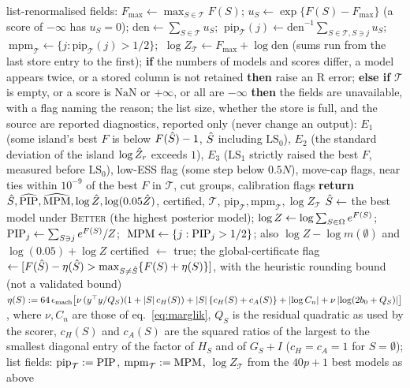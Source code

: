 \begin{algorithm}
{\begin{algorithmic}[1]
\State list-renormalised fields: $F_{\max}\gets\max_{S\in\mathcal T}F(S)$; $u_S\gets\exp\{F(S)-F_{\max}\}$ (a score of $-\infty$ has $u_S=0$); $\mathrm{den}\gets\sum_{S\in\mathcal T}u_S$; $\ \mathrm{pip}_{\mathcal T}(j)\gets\mathrm{den}^{-1}\sum_{S\in\mathcal T,S\ni j}u_S$; $\ \mathrm{mpm}_{\mathcal T}\gets\{j:\mathrm{pip}_{\mathcal T}(j)>1/2\}$; $\ \log Z_{\mathcal T}\gets F_{\max}+\log\mathrm{den}$ (sums run from the last store entry to the first); \textbf{if} the numbers of models and scores differ, a model appears twice, or a stored column is not retained \textbf{then} raise an R error; \textbf{else if} $\mathcal T$ is empty, or a score is $\mathrm{NaN}$ or $+\infty$, or all are $-\infty$ \textbf{then} the fields are unavailable, with a flag naming the reason; the list size, whether the store is full, and the source are reported %
\State diagnostics, reported only (never change an output): $E_1$ (some island's best $F$ is below $F(\hat S)-1$, $\hat S$ including $\mathrm{LS}_0$), $E_2$ (the standard deviation of the island $\log\hat Z_r$ exceeds $1$), $E_3$ ($\mathrm{LS}_1$ strictly raised the best $F$, measured before $\mathrm{LS}_0$), low-ESS flag (some step below $0.5N$), move-cap flags, near ties within $10^{-9}$ of the best $F$ in $\mathcal T$, cut groups, calibration flags %
\State \textbf{return} $\hat S,\widehat{\mathrm{PIP}},\widehat{\mathrm{MPM}},\log\hat Z,\log(0.05\hat Z)$, certified, $\mathcal T$, $\mathrm{pip}_{\mathcal T},\mathrm{mpm}_{\mathcal T},\log Z_{\mathcal T}$ %
\EndProcedure
{}
\State $\hat S\gets$ the best model under \textsc{Better} (the highest posterior model); $\log Z\gets\log\sum_{S\in\Omega}e^{F(S)}$; $\mathrm{PIP}_j\gets\sum_{S\ni j}e^{F(S)}/Z$; $\ \mathrm{MPM}\gets\{j:\mathrm{PIP}_j>1/2\}$; also $\log Z-\log m(\emptyset)$ and $\log(0.05)+\log Z$ %
\State certified $\gets$ true; the global-certificate flag $\gets[F(\hat S)-\eta(\hat S)>\max_{S\ne\hat S}\{F(S)+\eta(S)\}]$, with the heuristic rounding bound (not a validated bound) $\eta(S):=64\,\epsilon_{\mathrm{mach}}\big[\nu\,(y^\top y/Q_S)(1+\lvert S\rvert\,c_H(S))+\lvert S\rvert\,\{c_H(S)+c_A(S)\}+\lvert \log C_n\rvert+\nu\,\lvert \log(2b_0+Q_S)\rvert\big]$, where $\nu,C_n$ are those of eq.~\eqref{eq:marglik}, $Q_S$ is the residual quadratic as used by the scorer, $c_H(S)$ and $c_A(S)$ are the squared ratios of the largest to the smallest diagonal entry of the factor of $H_S$ and of $G_S+I$ ($c_H=c_A=1$ for $S=\emptyset$); list fields: $\mathrm{pip}_{\mathcal T}:=\mathrm{PIP}$, $\mathrm{mpm}_{\mathcal T}:=\mathrm{MPM}$, $\log Z_{\mathcal T}$ from the $40p+1$ best models as above %
\EndProcedure
\end{algorithmic}}
\end{algorithm}
